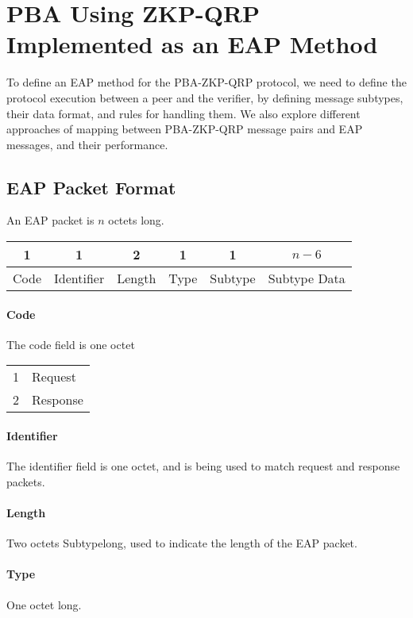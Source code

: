 \section{PBA Using ZKP-QRP Implemented as an EAP Method}
To define an EAP method for the PBA-ZKP-QRP protocol, we need to define the protocol execution between a peer and the verifier, by defining message subtypes, their data format, and rules for handling them.
We also explore different approaches of mapping between PBA-ZKP-QRP message pairs and EAP messages, and their performance.

\subsection{EAP Packet Format}
An EAP packet is $n$ octets long.

\begin{center}
\begin{tabular}{|c|c|c|c|c|c|}
	\hline
	1 & 1 & 2 & 1 & 1 & $n - 6$\\
	\hline
	Code & Identifier & Length & Type & Subtype & Subtype Data\\
	\hline 
\end{tabular}
\end{center}

\paragraph{Code}
The code field is one octet

\bigskip

\begin{tabular}{ll}
	1 & Request \\
	2 & Response\\
\end{tabular}

\paragraph{Identifier} The identifier field is one octet, and is being used to match request and response packets.

\paragraph{Length} Two octets Subtypelong, used to indicate the length of the EAP packet.

\paragraph{Type} One octet long.

